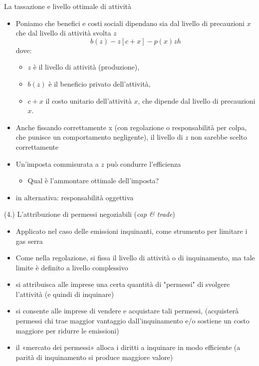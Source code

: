 \documentclass[aspectratio=64,11pt]{beamer}
\begin{document}
\begin{frame}{La tassazione e livello ottimale di attività}
\begin{itemize}
\item Poniamo che benefici e costi sociali dipendano sia dal livello di
precauzioni $x$ che dal livello di attività svolta $z$
\begin{equation*}
b(z) - z[c+x] - p(x)zh
\end{equation*}
dove:
\begin{itemize}
\item $z$ è il livello di attività (produzione),
\item $b(z)$ è il beneficio privato dell'attività,
\item $c + x$ il costo unitario dell’attività $x$, che dipende dal livello di
precauzioni $x$.
\end{itemize}
\item Anche fissando correttamente x (con regolazione o responsabilità per colpa,
che punisce un comportamento negligente), il livello di $z$ non sarebbe scelto
correttamente
\item Un'imposta commisurata a $z$ può condurre l’efficienza
\begin{itemize}
\item Qual è l’ammontare ottimale dell’imposta?
\end{itemize}
\item in alternativa: responsabilità oggettiva
\end{itemize}
\end{frame}

\begin{frame}{(4.) L'attribuzione di permessi negoziabili (\emph{cap \& trade})}
\begin{itemize}
\item Applicato nel caso delle emissioni inquinanti, come strumento per limitare i gas serra
\item Come nella regolazione, si fissa il livello di attività o di inquinamento, ma tale limite è definito a livello complessivo
\item si attribuisca alle imprese una certa quantità di "permessi" di svolgere l'attività (e quindi di inquinare)
\item si consente alle imprese di vendere e acquistare tali permessi, (acquisterà permessi chi trae maggior vantaggio dall'inquinamento e/o sostiene un costo maggiore per ridurre le emissioni)
\item il «mercato dei permessi» alloca i diritti a inquinare in modo efficiente (a parità di inquinamento si produce maggiore valore)
\end{itemize}
\end{frame}
\end{document}
